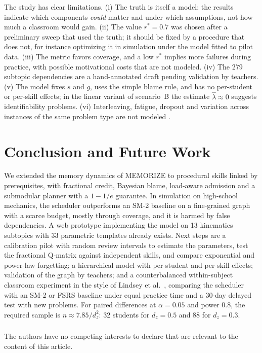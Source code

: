 \documentclass[runningheads]{llncs}
\newcommand{\rstar}{r^{\ast}}
\begin{document}
The study has clear limitations. (i) The truth is itself a model: the results indicate which components \emph{could} matter and under which assumptions, not how much a classroom would gain. (ii) The value $\rstar=0.7$ was chosen after a preliminary sweep that used the truth; it should be fixed by a procedure that does not, for instance optimizing it in simulation under the model fitted to pilot data. (iii) The metric favors coverage, and a low $\rstar$ implies more failures during practice, with possible motivational costs that are not modeled. (iv) The 279 subtopic dependencies are a hand-annotated draft pending validation by teachers. (v) The model fixes $s$ and $g$, uses the simple blame rule, and has no per-student or per-skill effects; in the linear variant of scenario~B the estimate $\hat\lambda\approx0$ suggests identifiability problems. (vi) Interleaving, fatigue, dropout and variation across instances of the same problem type are not modeled \cite{rohrer2015}.

\section{Conclusion and Future Work}

We extended the memory dynamics of MEMORIZE to procedural skills linked by prerequisites, with fractional credit, Bayesian blame, load-aware admission and a submodular planner with a $1-1/e$ guarantee. In simulation on high-school mechanics, the scheduler outperforms an SM-2 baseline on a fine-grained graph with a scarce budget, mostly through coverage, and it is harmed by false dependencies. A web prototype implementing the model on 13 kinematics subtopics with 33 parametric templates already exists. Next steps are a calibration pilot with random review intervals to estimate the parameters, test the fractional Q-matrix against independent skills, and compare exponential and power-law forgetting; a hierarchical model with per-student and per-skill effects; validation of the graph by teachers; and a counterbalanced within-subject classroom experiment in the style of Lindsey et al.\ \cite{lindsey2014}, comparing the scheduler with an SM-2 or FSRS baseline under equal practice time and a 30-day delayed test with new problems. For paired differences at $\alpha=0.05$ and power 0.8, the required sample is $n\approx7.85/d_z^2$: 32 students for $d_z=0.5$ and 88 for $d_z=0.3$.

\begin{credits}
\subsubsection{\discintname}
The authors have no competing interests to declare that are relevant to the content of this article.
\end{credits}



\end{document}

